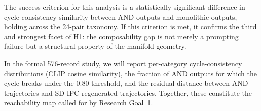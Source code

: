 The success criterion for this analysis is a statistically significant difference in cycle-consistency similarity between AND outputs and monolithic outputs, holding across the 24-pair taxonomy.
If this criterion is met, it confirms the third and strongest facet of H1: the composability gap is not merely a prompting failure but a structural property of the manifold geometry.

In the formal 576-record study, we will report per-category cycle-consistency distributions (CLIP cosine similarity), the fraction of AND outputs for which the cycle breaks under the $0.80$ threshold, and the residual distance between AND trajectories and SD-IPC-regenerated trajectories.
Together, these constitute the reachability map called for by Research Goal~1.

